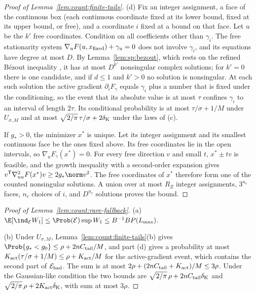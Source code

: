 \begin{proof}[Proof of Lemma~\ref{lem:count:finite-tails}]
(d) Fix an integer assignment, a face of the continuous box (each continuous
coordinate fixed at its lower bound, fixed at its upper bound, or free), and
a coordinate $i$ fixed at a bound on that face. Let $u$ be the $k'$ free
coordinates. Condition on all coefficients other than $\gamma_i$. The free
stationarity system $\nabla_uF(u,x_{\rm fixed})+\gamma_u=0$ does not involve
$\gamma_i$, and its equations have degree at most $D$. By
Lemma~\ref{lem:sp:bezout}, which rests on the refined B\'ezout inequality
\cite{fulton1998-intersection-theory}, it has at most $D^{k'}$ nonsingular
complex solutions; for $k'=0$ there is one candidate, and if $d\le1$ and
$k'>0$ no solution is nonsingular. At each
such solution the active gradient $\partial_iF_\gamma$ equals $\gamma_i$ plus
a number that is fixed under the conditioning, so the event that its absolute
value is at most $\tau$ confines $\gamma_i$ to an interval of length $2\tau$.
Its conditional probability is at most $\tau/\sigma+1/M$ under
$U_{\sigma,M}$ and at most $\sqrt{2/\pi}\,\tau/\sigma+2\delta_{\rm K}$
under the laws of (c).

If $g_*>0$, the minimizer $x^*$ is unique. Let its integer assignment and
its smallest continuous face be the ones fixed above. Its free coordinates lie
in the open intervals, so $\nabla_uF_\gamma(x^*)=0$. For every free direction
$v$ and small $t$, $x^*\pm tv$ is feasible, and the growth inequality with a
second-order expansion gives $v^{\mathsf T}\nabla_{uu}^2F(x^*)v\ge2g_*\norm v^2$. The
free coordinates of $x^*$ therefore form one of the counted nonsingular
solutions. A union over at most $R_Z$ integer assignments, $3^{n_c}$ faces,
$n_c$ choices of $i$, and $D^{n_c}$ solutions proves the bound.
\end{proof}

\begin{proof}[Proof of Lemma~\ref{lem:count:rare-fallback}]
(a) $\E[\ind_{\mathcal E}W_1]\le\Prob(\mathcal E)\sup W_1\le B^{-1}BP(L_{\max})$.

(b) Under $U_{\sigma,M}$, Lemma~\ref{lem:count:finite-tails}(b) gives
$\Prob\{g_*<g_0\}\le\rho+2nC_{\rm tail}/M$, and part (d) gives a probability
at most $K_{\rm act}(\tau/\sigma+1/M)\le\rho+K_{\rm act}/M$ for the
active-gradient event, which contains the second part of
$\mathcal E_{\rm bad}$. The sum is at most $2\rho+(2nC_{\rm tail}+K_{\rm act})/M\le3\rho$.
Under the Gaussian-like condition the two bounds are
$\sqrt{2/\pi}\,\rho+2nC_{\rm tail}\delta_{\rm K}$ and
$\sqrt{2/\pi}\,\rho+2K_{\rm act}\delta_{\rm K}$, with sum at most $3\rho$.
\end{proof}

